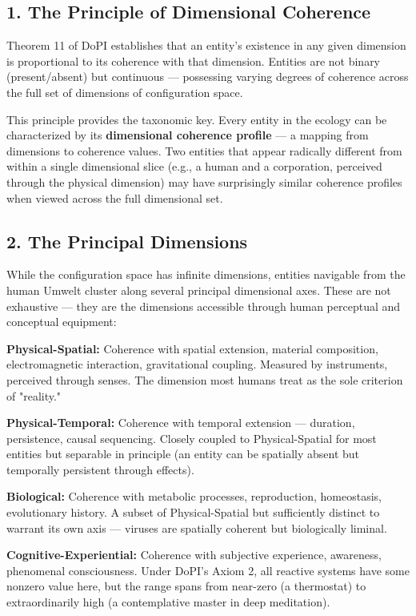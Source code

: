 \subsection*{1. The Principle of Dimensional Coherence}


Theorem 11 of DoPI establishes that an entity's existence in any given dimension is proportional to its coherence with that dimension. Entities are not binary (present/absent) but continuous — possessing varying degrees of coherence across the full set of dimensions of configuration space.


This principle provides the taxonomic key. Every entity in the ecology can be characterized by its \textbf{dimensional coherence profile} — a mapping from dimensions to coherence values. Two entities that appear radically different from within a single dimensional slice (e.g., a human and a corporation, perceived through the physical dimension) may have surprisingly similar coherence profiles when viewed across the full dimensional set.


\subsection*{2. The Principal Dimensions}


While the configuration space has infinite dimensions, entities navigable from the human Umwelt cluster along several principal dimensional axes. These are not exhaustive — they are the dimensions accessible through human perceptual and conceptual equipment:


\textbf{Physical-Spatial:} Coherence with spatial extension, material composition, electromagnetic interaction, gravitational coupling. Measured by instruments, perceived through senses. The dimension most humans treat as the sole criterion of "reality."


\textbf{Physical-Temporal:} Coherence with temporal extension — duration, persistence, causal sequencing. Closely coupled to Physical-Spatial for most entities but separable in principle (an entity can be spatially absent but temporally persistent through effects).


\textbf{Biological:} Coherence with metabolic processes, reproduction, homeostasis, evolutionary history. A subset of Physical-Spatial but sufficiently distinct to warrant its own axis — viruses are spatially coherent but biologically liminal.


\textbf{Cognitive-Experiential:} Coherence with subjective experience, awareness, phenomenal consciousness. Under DoPI's Axiom 2, all reactive systems have some nonzero value here, but the range spans from near-zero (a thermostat) to extraordinarily high (a contemplative master in deep meditation).


